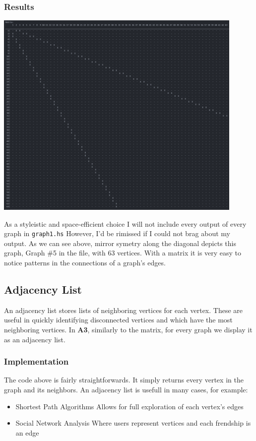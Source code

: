 \documentclass[12pt, letterpaper]{article}
\begin{document}
\subsubsection{Results}
\begin{center}
   \includegraphics[width=120mm,scale=0.5]{Images/Graph3_Matrix.png}
\end{center}
As a styleistic and space-efficient choice I will not include every output of every graph in \texttt{graph1.hs}
However, I'd be rimissed if I could not brag about my output.
As we can see above, mirror symetry along the diagonal depicts this graph, Graph \#5 in the file, with 63 vertices.
With a matrix it is very easy to notice patterns in the connections of a graph's edges.

\subsection{Adjacency List} \label{AdjList}
An adjacency list stores lists of neighboring vertices for each vertex.
These are useful in quickly identifying disconnected vertices and which have the most neighboring vertices.
In \textbf{A3}, similarly to the matrix, for every graph we display it as an adjacency list.
\subsubsection{Implementation}
\begin{center}
   
\end{center}
The code above is fairly straightforwards. It simply returns every vertex in the graph and its neighbors.
An adjacency list is usefull in many cases, for example:
\begin{itemize}
   \item Shortest Path Algorithms
   \subitem Allows for full exploration of each vertex's edges
   \item Social Network Analysis
   \subitem Where users represent vertices and each frendship is an edge
\end{itemize}
\end{document}
